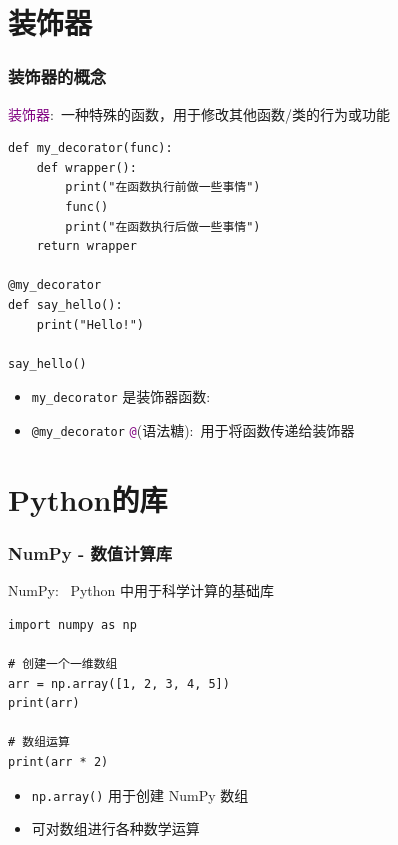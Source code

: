 \section{装饰器}
\begin{frame}[fragile]
    \frametitle{装饰器的概念}
    \textcolor{purple}{装饰器}:~一种特殊的函数，用于修改其他函数/类的行为或功能
    \begin{lstlisting}[style=pythonstyle]
def my_decorator(func):
    def wrapper():
        print("在函数执行前做一些事情")
        func()
        print("在函数执行后做一些事情")
    return wrapper

@my_decorator
def say_hello():
    print("Hello!")

say_hello()
    \end{lstlisting}
    \begin{itemize}
        \item \texttt{my\_decorator} 是装饰器函数:\\
		{\fontsize{7.2pt}{4.2pt}\selectfont{装饰器函数接受一个函数作为参数，并返回一个新的函数}}
	\item \texttt{@my\_decorator} \texttt{\textcolor{purple}{@}}(语法糖):~用于将函数{\fontsize{6.5pt}{4.2pt}}传递给装饰器{\fontsize{6.5pt}{4.2pt}}
    \end{itemize}
\end{frame}
%
\section{\rm{Python}的库}
\begin{frame}[fragile]
	\frametitle{\textrm{NumPy} - 数值计算库}
	\textrm{NumPy}:~ \textrm{Python} 中用于科学计算的基础库\\
	{\fontsize{8.5pt}{4.2pt}\selectfont{提供高性能的多维数组对象和数组处理的工具}}
    \begin{lstlisting}[style=pythonstyle]
import numpy as np

# 创建一个一维数组
arr = np.array([1, 2, 3, 4, 5])
print(arr)

# 数组运算
print(arr * 2)
    \end{lstlisting}
    \begin{itemize}
	    \item \texttt{np.array()} 用于创建 \textrm{NumPy} 数组
        \item 可对数组进行各种数学运算
    \end{itemize}
\end{frame}

